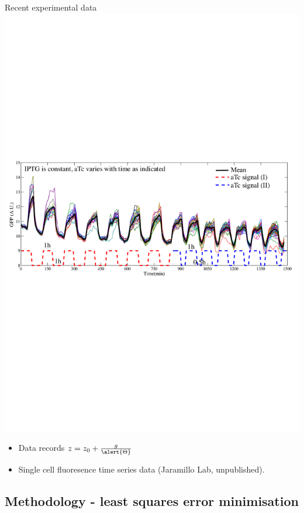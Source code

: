 \documentclass{beamer}
\begin{document}
\begin{frame}{Recent experimental data}{}
   \includegraphics[trim = 0 300 0 300,clip = true,scale = 0.55]{Figures/13_9}
  \begin{itemize}
      \item  Data records $z= z_{0} +\frac{g}{\alert{\Theta}} $
    \item Single cell fluoresence time series data (Jaramillo Lab, unpublished).
    \end{itemize}
\end{frame}


\subsection{Methodology - least squares error minimisation}
\end{document}
